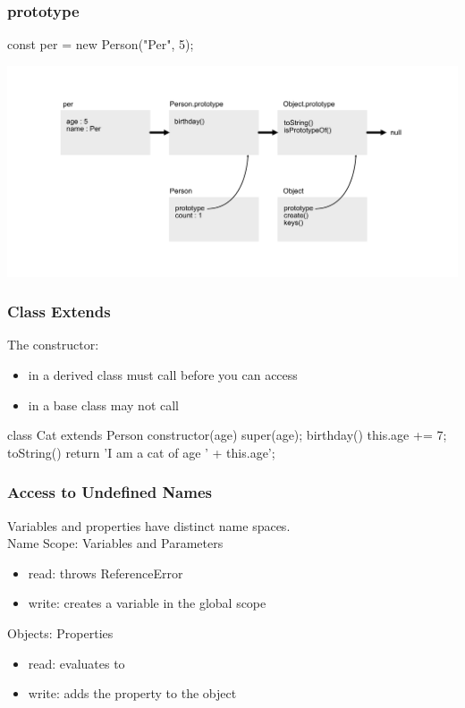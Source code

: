 \begin{frame}[fragile] \frametitle{prototype}
\begin{CodeBox}{}
  const per = new Person("Per", 5);
\end{CodeBox}
  \centering
  \includegraphics[width=14cm]{img/prototype_chain6}
\end{frame}


\begin{frame}[fragile] \frametitle{Class Extends}
The constructor:
\begin{itemize}
  \item in a derived class must call  before you can access 
  \item in a base class may not call 
\end{itemize}
\begin{CodeBox}{}
class Cat extends Person {
  constructor(age) {
    super(age);
  }
  birthday() {
    this.age += 7;
  }
  toString() {
    return 'I am a cat of age ' + this.age';
  }
}
\end{CodeBox}
\end{frame}

\begin{frame}[fragile] \frametitle{Access to Undefined Names}
Variables and properties have distinct name spaces.
\\ \vspace{4mm}
Name Scope: Variables and Parameters
\begin{itemize}
  \item read: throws ReferenceError
  \item write: creates a variable in the global scope
\end{itemize}
\vspace{5mm}
Objects: Properties
\begin{itemize}
  \item read: evaluates to 
  \item write: adds the property to the object
\end{itemize}
\end{frame}

